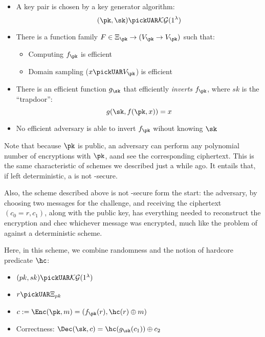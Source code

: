 \begin{itemize}
    \item A key pair is chosen \uar{} by a key generator algorithm:
    \[
        (\pk, \sk) \pickUAR \keygen(1^\lambda)
    \]
    \item There is a function family $F \in \Xi_\pk \to (V_{\pk} \to V_{\pk})$ such that:
    \begin{itemize}
        \item Computing $f_{\pk}$ is efficient
        \item Domain sampling ($x \pickUAR V_{\pk}$) is efficient
    \end{itemize}
    \item There is an efficient function $g_{\sk}$ that efficiently \emph{inverts} $f_{\pk}$, where $sk$ is the ``trapdoor'': 
    \[
        g(\sk, f(\pk, x)) = x
    \]
    \item No efficient adversary is able to invert $f_{\pk}$ wihout knowing $\sk$
\end{itemize}

Note that because $\pk$ is public, an adversary can perform any polynomial number of encryptions with $\pk$, aand see the corresponding ciphertext. This is the same characteristic of \pke{} schemes we described just a while ago. It entails that, if left deterministic, a \tdp{} is not \cpa-secure.

Also, the scheme described above is not \cpa-secure form the start: the adversary, by choosing two messages for the challenge, and receiving the ciphertext $(c_0 = r, c_1)$, along with the public key, has everything needed to reconstruct the encryption and chec whichever message was encrypted, much like the problem of \ufcma against a deterministic \mac scheme.

Here, in this scheme, we combine randomness and the notion of hardcore predicate $\hc$:

\begin{itemize}
    \item $(pk, sk) \pickUAR \keygen(1^\lambda)$
    \item $r \pickUAR \Xi_{pk}$
    \item $c := \Enc(\pk, m) = (f_{\pk}(r), \hc(r) \oplus m)$
    \item Correctness: $\Dec(\sk, c) = \hc(g_{\sk}(c_1)) \oplus c_2$
\end{itemize}

